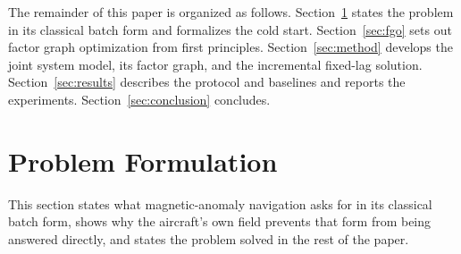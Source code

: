 \documentclass{IEEEtaes}
\begin{document}
The remainder of this paper is organized as follows.
Section~\ref{sec:problem} states the problem in its classical batch form and
formalizes the cold start. Section~\ref{sec:fgo} sets out factor graph
optimization from first principles. Section~\ref{sec:method} develops the joint
system model, its factor graph, and the incremental fixed-lag solution.
Section~\ref{sec:results} describes the protocol and baselines and reports the
experiments. Section~\ref{sec:conclusion} concludes.

\section{Problem Formulation}\label{sec:problem}
This section states what magnetic-anomaly navigation asks for in its classical
batch form, shows why the aircraft's own field prevents that form from being
answered directly, and states the problem solved in the rest of the paper.
\end{document}
